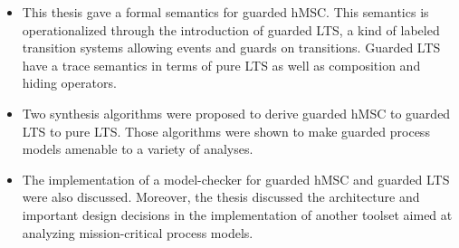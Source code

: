 \begin{itemize}
\item This thesis gave a formal semantics for guarded hMSC. This semantics is operationalized through the introduction of guarded LTS, a kind of labeled transition systems allowing events and guards on transitions. Guarded LTS have a trace semantics in terms of pure LTS as well as composition and hiding operators.
\item Two synthesis algorithms were proposed to derive guarded hMSC to guarded LTS to pure LTS. Those algorithms were shown to make guarded process models amenable to a variety of analyses.
\item The implementation of a model-checker for guarded hMSC and guarded LTS were also discussed. Moreover, the thesis discussed the architecture and important design decisions in the implementation of another toolset aimed at analyzing mission-critical process models.
\end{itemize}
